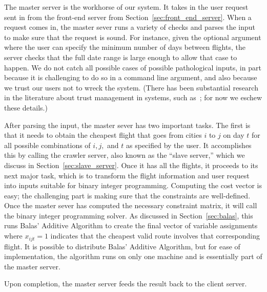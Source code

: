 \documentclass{article}
\begin{document}
The master server is the workhorse of our system. It takes in the user request sent in from the front-end server from
Section~\ref{sec:front_end_server}. When a request comes in, the master sever runs a variety of checks and parses the input to make sure that the
request is sound. For instance, given the optional argument where the user can specify the minimum number of days between flights, the server checks
that the full date range is large enough to allow that case to happen. We do not catch all possible cases of possible pathological inputs, in part
because it is challenging to do so in a command line argument, and also because we trust our users not to wreck the system. (There has been
substantial research in the literature about trust management in systems, such as~\cite{Blaze:2001:RTM:380171.380186}; for now we eschew these
details.)

After parsing the input, the master sever has two important tasks. The first is that it needs to obtain the cheapest flight that goes from cities $i$
to $j$ on day $t$ for all possible combinations of $i, j,$ and $t$ as specified by the user. It accomplishes this by calling the crawler server, also
known as the ``slave server,'' which we discuss in Section~\ref{sec:slave_server}. Once it has all the flights, it proceeds to its next major task,
which is to transform the flight information and user request into inputs suitable for binary integer programming. Computing the cost vector is easy;
the challenging part is making sure that the constraints are well-defined. Once the master sever has computed the necessary constraint matrix, it will
call the binary integer programming solver.  As discussed in Section~\ref{sec:balas}, this runs Balas' Additive Algorithm to create the final vector
of variable assignments where $x_{ijt} = 1$ indicates that the cheapest valid route involves that corresponding flight. It is possible to distribute
Balas' Additive Algorithm, but for ease of implementation, the algorithm runs on only one machine and is essentially part of the master server.

Upon completion, the master server feeds the result back to the client server.

\end{document}
